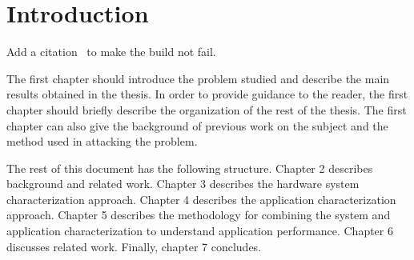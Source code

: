 
\chapter{Introduction}
Add a citation~\cite{IEEEexample:urlsty} to make the build not fail.

The first chapter should introduce the problem studied and describe the main results obtained in the thesis.
In order to provide guidance to the reader, the first chapter should briefly describe the organization of the rest of the thesis.
The first chapter can also give the background of previous work on the subject and the method used in attacking the problem.

\outline{

}



The rest of this document has the following structure.
Chapter 2 describes background and related work.
Chapter 3 describes the hardware system characterization approach.
Chapter 4 describes the application characterization approach.
Chapter 5 describes the methodology for combining the system and application characterization to understand application performance.
Chapter 6 discusses related work.
Finally, chapter 7 concludes.
